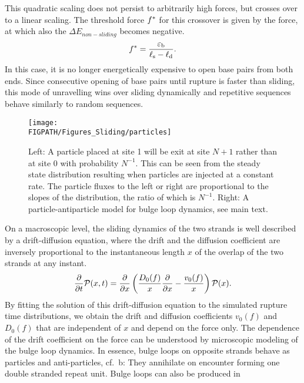 This quadratic scaling does not persist to arbitrarily high forces, but crosses over to a linear
scaling. The threshold force ${f^*}$ for this crossover is given by the force, at
which also the $\Delta E_{non-sliding}$ becomes negative.
\begin{equation}
\label{eq:sliding_fc_unravell}
{f^*}=\frac{{\varepsilon_{\rm b}}}{{\ell_{\rm s}}-{\ell_{\rm d}}}.
\end{equation}
In this case, it is no longer 
energetically expensive to open base pairs from both ends. Since
consecutive opening of base pairs until rupture is faster than sliding, this 
mode of unravelling wins over sliding dynamically and repetitive sequences behave
similarly to random sequences. 

\begin{figure} 
\centering
\texttt{[image: \\FIGPATH/Figures\_Sliding/particles]}
\caption[Microscopic dynamics of DNA sliding.]{\label{fig:particles}
Left: A particle placed at site 1 will be exit at site $N+1$ rather than at site $0$ with probability $N^{{-1}}$. This 
can be seen from the steady state distribution resulting when particles are injected at a constant rate. 
The particle fluxes to the left or right are proportional to the slopes of the distribution, the ratio of which
is $N^{-1}$. 
Right: A particle-antiparticle model for bulge loop dynamics, see main text.
}
\end{figure}
On a macroscopic level, the sliding dynamics of the two strands is well described by a drift-diffusion
equation, where the drift and the diffusion coefficient are inversely proportional to the instantaneous
length $x$ of the overlap of the two strands at any instant. 
\begin{equation}
\label{eq:sliding_drift_diff}
\frac{\partial}{\partial t} {\cal P}(x,t)=\frac{\partial}{\partial x} \left(\frac{D_0(f)}{x}\frac{\partial}{\partial x}-\frac{v_0(f)}{x}\right){\cal P}(x).
\end{equation}
By fitting the solution of this drift-diffusion
equation to the simulated rupture time distributions, we obtain the drift and diffusion 
coefficients $v_0(f)$ and $D_0(f)$ that
are independent of $x$ and depend on the force only. The dependence of the 
drift coefficient on the force can be understood by microscopic modeling of the bulge loop dynamics.
In essence, bulge loops on opposite strands behave as particles and anti-particles, cf.~b: They annihilate 
on encounter forming one double stranded repeat unit. Bulge loops can also be produced in 
